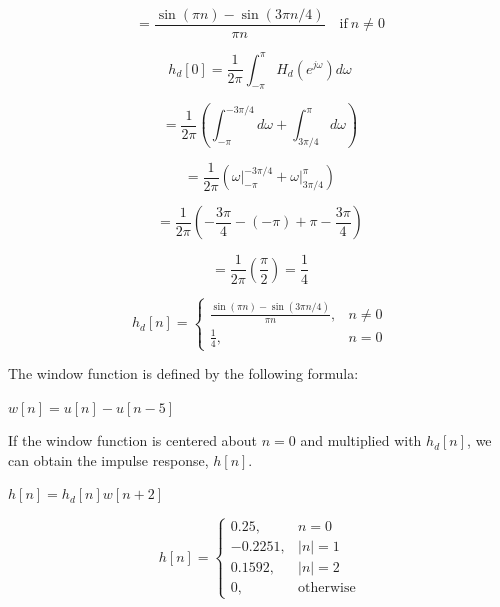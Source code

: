 \documentclass[fleqn]{article}
\begin{document}
\begin{enumerate}[nolistsep]
		\begin{equation*}
			= \frac{\sin{({\pi}n)} - \sin{(3{\pi}n/4)}}{{\pi}n} \quad {\text{if}}\ n \neq 0
		\end{equation*}
		
		\begin{equation*}
			h_d[0] = \frac{1}{2\pi}\int_{-\pi}^{\pi}{H_d(e^{j\omega})d\omega}
		\end{equation*}
		
		\begin{equation*}
			= \frac{1}{2\pi}\left(\int_{-\pi}^{-3\pi/4}{d\omega} + \int_{3\pi/4}^{\pi}{d\omega}\right)
		\end{equation*}
		
		\begin{equation*}
			= \frac{1}{2\pi}\left(\left.\omega\right\vert_{-\pi}^{-3\pi/4} + \left.\omega\right\vert_{3\pi/4}^{\pi}\right)
		\end{equation*}
		
		\begin{equation*}
			= \frac{1}{2\pi}\left(-\frac{3\pi}{4} - (-\pi) + \pi - \frac{3\pi}{4}\right)
		\end{equation*}
		
		\begin{equation*}
			= \frac{1}{2\pi}\left(\frac{\pi}{2}\right) = \frac{1}{4}
		\end{equation*}
		
		\begin{equation*}
			h_d[n] =
			\begin{cases}
				\frac{\sin{({\pi}n)} - \sin{(3{\pi}n/4)}}{{\pi}n}, & n \neq 0 \\
				\frac{1}{4}, & n = 0
			\end{cases}
		\end{equation*}
		
		The window function is defined by the following formula:
		
		$w[n] = u[n] - u[n - 5]$
		
		If the window function is centered about $n = 0$ and multiplied with $h_d[n]$, we can obtain the impulse response, $h[n]$.
		
		$h[n] = h_d[n]w[n + 2]$
		
		\begin{equation*}
			h[n] =
			\begin{cases}
				0.25, & n = 0 \\
				-0.2251, & |n| = 1 \\
				0.1592, & |n| = 2\\
				0, & \text{otherwise}
			\end{cases}
		\end{equation*}
		

\end{enumerate}
\end{document}
